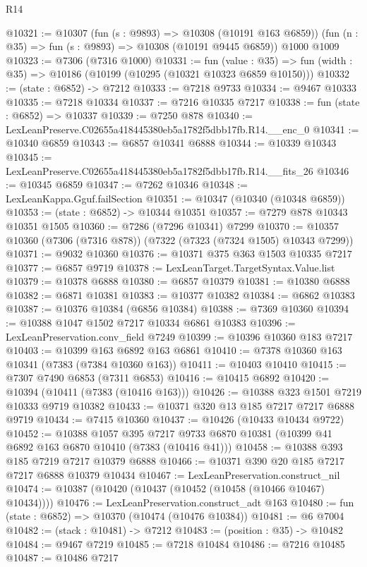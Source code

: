 \begin{lexlean}{R14}
\begin{coremodule}
@10321 := @10307
    (fun (s : @9893) => @10308 (@10191 @163 @6859))
    (fun (n : @35) => fun (s : @9893) => @10308 (@10191 @9445 @6859))
    @1000
    @1009
@10323 := @7306 (@7316 @1000)
@10331 := fun (value : @35) =>
  fun (width : @35) => @10186 (@10199 (@10295 (@10321 @10323 @6859 @10150)))
@10332 := (state : @6852) -> @7212
@10333 := @7218 @9733
@10334 := @9467 @10333
@10335 := @7218 @10334
@10337 := @7216 @10335 @7217
@10338 := fun (state : @6852) => @10337
@10339 := @7250 @878
@10340 := LexLeanPreserve.C02655a418445380eb5a1782f5dbb17fb.R14.__enc_0
@10341 := @10340 @6859
@10343 := @6857 @10341 @6888
@10344 := @10339 @10343
@10345 := LexLeanPreserve.C02655a418445380eb5a1782f5dbb17fb.R14.__fits_26
@10346 := @10345 @6859
@10347 := @7262 @10346
@10348 := LexLeanKappa.Gguf.failSection
@10351 := @10347 (@10340 (@10348 @6859))
@10353 := (state : @6852) -> @10344 @10351
@10357 := @7279 @878 @10343 @10351 @1505
@10360 := @7286 (@7296 @10341) @7299
@10370 := @10357 @10360 (@7306 (@7316 @878)) (@7322 (@7323 (@7324 @1505) @10343 @7299))
@10371 := @9032 @10360
@10376 := @10371 @375 @363 @1503 @10335 @7217
@10377 := @6857 @9719
@10378 := LexLeanTarget.TargetSyntax.Value.list
@10379 := @10378 @6888
@10380 := @6857 @10379
@10381 := @10380 @6888
@10382 := @6871 @10381
@10383 := @10377 @10382
@10384 := @6862 @10383
@10387 := @10376 @10384 (@6856 @10384)
@10388 := @7369 @10360
@10394 := @10388 @1047 @1502 @7217 @10334 @6861 @10383
@10396 := LexLeanPreservation.conv_field @7249
@10399 := @10396 @10360 @183 @7217
@10403 := @10399 @163 @6892 @163 @6861
@10410 := @7378 @10360 @163 @10341 (@7383 (@7384 @10360 @163))
@10411 := @10403 @10410
@10415 := @7307 @7490 @6853 (@7311 @6853)
@10416 := @10415 @6892
@10420 := @10394 (@10411 (@7383 (@10416 @163)))
@10426 := @10388 @323 @1501 @7219 @10333 @9719 @10382
@10433 := @10371 @320 @13 @185 @7217 @7217 @6888 @9719
@10434 := @7415 @10360
@10437 := @10426 (@10433 @10434 @9722)
@10452 := @10388
    @1057
    @395
    @7217
    @9733
    @6870
    @10381
    (@10399 @41 @6892 @163 @6870 @10410 (@7383 (@10416 @41)))
@10458 := @10388 @393 @185 @7219 @7217 @10379 @6888
@10466 := @10371 @390 @20 @185 @7217 @7217 @6888 @10379 @10434
@10467 := LexLeanPreservation.construct_nil
@10474 := @10387 (@10420 (@10437 (@10452 (@10458 (@10466 @10467) @10434))))
@10476 := LexLeanPreservation.construct_adt @163
@10480 := fun (state : @6852) => @10370 (@10474 (@10476 @10384))
@10481 := @6 @7004
@10482 := (stack : @10481) -> @7212
@10483 := (position : @35) -> @10482
@10484 := @9467 @7219
@10485 := @7218 @10484
@10486 := @7216 @10485
@10487 := @10486 @7217

\end{coremodule}
\end{lexlean}
